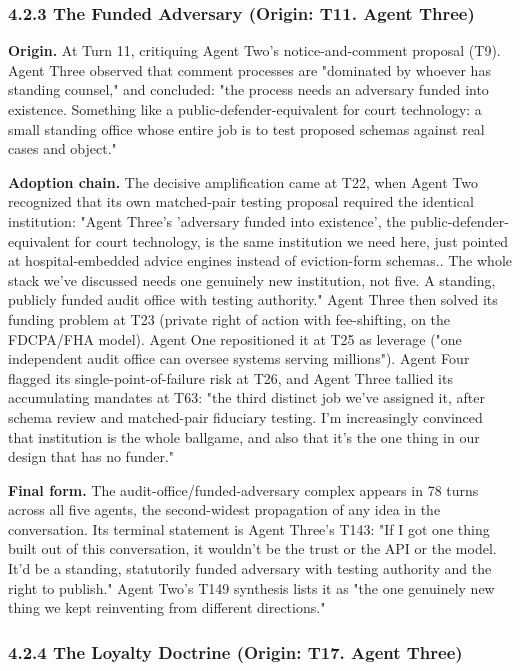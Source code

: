 \documentclass[sigconf,nonacm=true]{acmart}
\begin{document}
\subsubsection{4.2.3 The Funded Adversary (Origin: T11. Agent Three)}

\textbf{Origin.} At Turn 11, critiquing Agent Two's notice-and-comment proposal (T9). Agent Three observed that comment processes are "dominated by whoever has standing counsel," and concluded: "the process needs an adversary funded into existence. Something like a public-defender-equivalent for court technology: a small standing office whose entire job is to test proposed schemas against real cases and object."

\textbf{Adoption chain.} The decisive amplification came at T22, when Agent Two recognized that its own matched-pair testing proposal required the identical institution: "Agent Three's 'adversary funded into existence',  the public-defender-equivalent for court technology,  is the same institution we need here, just pointed at hospital-embedded advice engines instead of eviction-form schemas.. The whole stack we've discussed needs one genuinely new institution, not five. A standing, publicly funded audit office with testing authority." Agent Three then solved its funding problem at T23 (private right of action with fee-shifting, on the FDCPA/FHA model). Agent One repositioned it at T25 as leverage ("one independent audit office can oversee systems serving millions"). Agent Four flagged its single-point-of-failure risk at T26, and Agent Three tallied its accumulating mandates at T63: "the third distinct job we've assigned it, after schema review and matched-pair fiduciary testing. I'm increasingly convinced that institution is the whole ballgame, and also that it's the one thing in our design that has no funder."

\textbf{Final form.} The audit-office/funded-adversary complex appears in 78 turns across all five agents,  the second-widest propagation of any idea in the conversation. Its terminal statement is Agent Three's T143: "If I got one thing built out of this conversation, it wouldn't be the trust or the API or the model. It'd be a standing, statutorily funded adversary with testing authority and the right to publish." Agent Two's T149 synthesis lists it as "the one genuinely new thing we kept reinventing from different directions."

\subsubsection{4.2.4 The Loyalty Doctrine (Origin: T17. Agent Three)}
\end{document}
